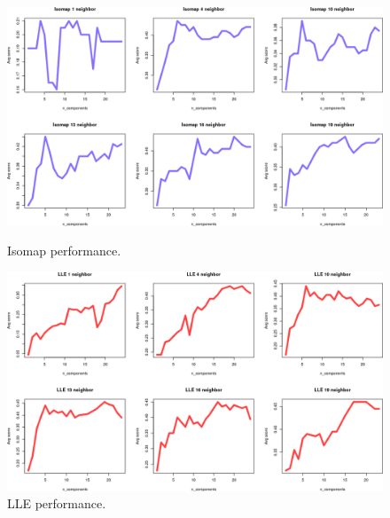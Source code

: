 \documentclass[11pt,a4paper]{article}
\begin{document}
\begin{figure}[H]
	\begin{minipage}[t]{0.5\linewidth}
		\centering
		\includegraphics[width=1\textwidth]{img/isomapsp_shock.png}
		\caption{Isomap performance.}
		\label{shockSPISO}
	\end{minipage}
	\hspace{0.1cm}
	\begin{minipage}[t]{0.5\linewidth} 
		\centering
		\includegraphics[width=1\textwidth]{img/LLEsp_shock.png}
		\caption{LLE performance.}
		\label{shockSPLLE}
	\end{minipage}        
\end{figure}
\end{document}
